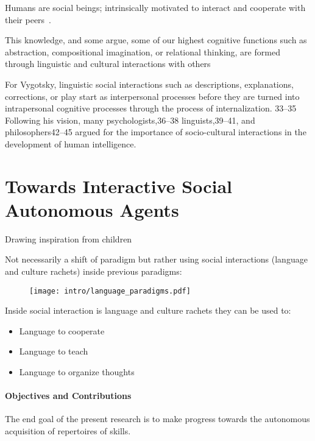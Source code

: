 Humans are social beings; intrinsically motivated to interact and cooperate with their peers~\citep{tomasello_cultural_1999,tomasello_understanding_2005, brewer2014addressing}. 

This knowledge, and some argue, some of our highest cognitive functions such as abstraction, compositional imagination, or relational thinking, are formed through linguistic and cultural interactions with others

 For Vygotsky, linguistic social interactions such as descriptions, explanations, corrections, or play start as interpersonal processes before they are turned into intrapersonal cognitive processes through the process of internalization. 33–35 Following his vision, many psychologists,36–38 linguists,39–41, and philosophers42–45 argued for the importance of socio-cultural interactions in the development of human intelligence.

 


\section*{Towards Interactive Social Autonomous Agents}

Drawing inspiration from children 

Not necessarily a shift of paradigm but rather using social interactions (language and culture rachets) inside previous paradigms:

\begin{figure}[!h]
\centering
\texttt{[image: intro/language\_paradigms.pdf]}
\caption{}
\label{fig:intro_language_paradimgs}
\end{figure}

Inside social interaction is language and culture rachets they can be used to:
\begin{itemize}[noitemsep]
\item Language to cooperate 
\item Language to teach \cite{sigaud2021towards}
\item Language to organize thoughts	
\end{itemize}


\paragraph{Objectives and Contributions}

The end goal of the present research is to make progress towards the autonomous acquisition of repertoires of skills. 

